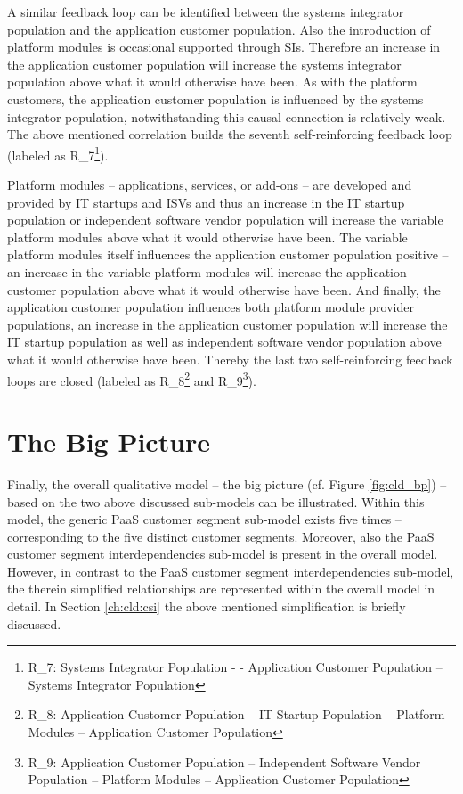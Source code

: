 A similar feedback loop can be identified between the systems integrator population and the application customer population. Also the introduction of platform modules is occasional supported through \acp{SI}. Therefore an increase in the application customer population will increase the systems integrator population above what it would otherwise have been. As with the platform customers, the application customer population is influenced by the systems integrator population, notwithstanding this causal connection is relatively weak. The above mentioned correlation builds the seventh self-reinforcing feedback loop (labeled as R\_7\footnote{R\_7: Systems Integrator Population - - Application Customer Population -- Systems Integrator Population}).

Platform modules -- applications, services, or add-ons -- are developed and provided by \ac{IT} startups and \acp{ISV} and thus an increase in the \ac{IT} startup population or independent software vendor population will increase the variable platform modules above what it would otherwise have been. The variable platform modules itself influences the application customer population positive -- an increase in the variable platform modules will increase the application customer population above what it would otherwise have been. And finally, the application customer population influences both platform module provider populations, an increase in the application customer population will increase the \ac{IT} startup population as well as independent software vendor population above what it would otherwise have been. Thereby the last two self-reinforcing feedback loops are closed (labeled as R\_8\footnote{R\_8: Application Customer Population -- \ac{IT} Startup Population -- Platform Modules -- Application Customer Population}  and R\_9\footnote{R\_9: Application Customer Population -- Independent Software Vendor Population -- Platform Modules -- Application Customer Population}).

\section{The Big Picture}\label{ch:cld:bp}

Finally, the overall qualitative model -- the big picture (cf. Figure \ref{fig:cld_bp}) -- based on the two above discussed sub-models can be illustrated. Within this model, the generic \ac{PaaS} customer segment sub-model exists five times -- corresponding to the five distinct customer segments. Moreover, also the \ac{PaaS} customer segment interdependencies sub-model is present in the overall model. However, in contrast to the \ac{PaaS} customer segment interdependencies sub-model, the therein simplified relationships are represented within the overall model in detail. In Section \ref{ch:cld:csi} the above mentioned simplification is briefly discussed.

